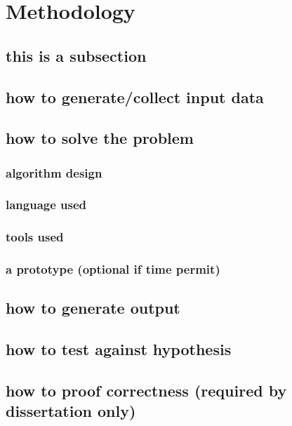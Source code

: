 \section{Methodology}



\subsection{this is a subsection}
\subsection{how to generate/collect input data}

\subsection{how to solve the problem}
\subsubsection{algorithm design}
\subsubsection{language used}
\subsubsection{tools used}
\subsubsection{a prototype (optional if time permit)}

\subsection{how to generate output}
\subsection{how to test against hypothesis}
\subsection{how to proof correctness (required by dissertation only)}
